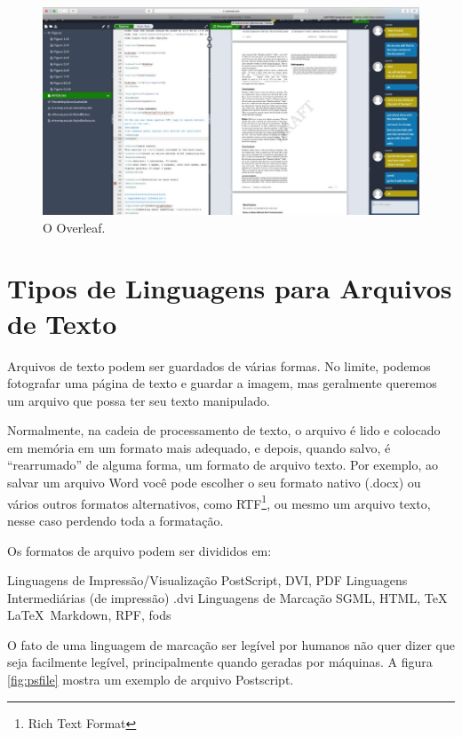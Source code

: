 \begin{figure}[hbt]
    \centering
    \includegraphics[width=0.7\linewidth]{Images/overleaf}
    \caption[O Overleaf]{O Overleaf.}
    \label{fig:overleaf}
\end{figure}



\section{Tipos de Linguagens para Arquivos de Texto}

Arquivos de texto podem ser guardados de várias formas. No limite, podemos fotografar uma página de texto e guardar a imagem, mas geralmente queremos um arquivo que possa ter seu texto manipulado.

Normalmente, na cadeia de processamento de texto, o arquivo é lido e colocado em memória em um formato mais adequado, e depois, quando salvo, é \enquote{rearrumado} de alguma forma, um formato de arquivo texto. Por exemplo, ao salvar um arquivo Word você pode escolher o seu formato nativo (.docx) ou vários outros formatos alternativos, como RTF\footnote{Rich Text Format}, ou mesmo um arquivo texto, nesse caso perdendo toda a formatação.

Os formatos de arquivo podem ser divididos em:
            \begin{outline}
    \1  Linguagens de Impressão/Visualização
    \2  PostScript, DVI, PDF 
    \1  Linguagens Intermediárias (de impressão)
    \2 .dvi
    \1  Linguagens de Marcação      
    \2  SGML, HTML, \TeX\, \LaTeX\, Markdown, RPF, fods
\end{outline}

O fato de uma linguagem de marcação ser legível por humanos não quer dizer que seja facilmente legível, principalmente quando geradas por máquinas. A figura \ref{fig:psfile} mostra um 
exemplo de arquivo Postscript.

